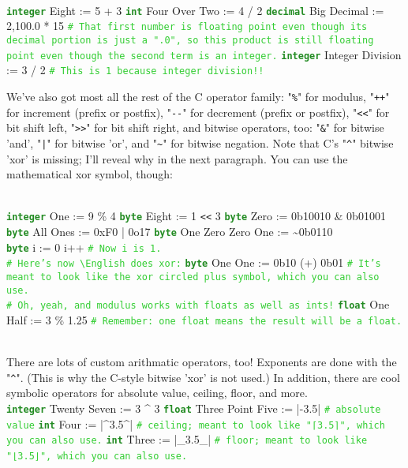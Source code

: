 \documentclass{article}
\newcommand{\English}{\textbackslash{}English}				%
\newcommand{\codecomment}[1]{\texttt{\textcolor{LimeGreen}{#1}}}
\newcommand{\commentline}[1]{\codecomment{\# #1}}
\newcommand{\type}[1]{\texttt{\textcolor{ForestGreen}{\textbf{#1}}}}
\newenvironment{code}[0]
{\ttfamily{}				%
\setlength\parindent{0cm}	%
~\\}
{\setlength\parindent{1cm}
~\\}
\begin{document}
\begin{code}
\type{integer} Eight := 5 + 3
\type{int} Four Over Two := 4 / 2
\type{decimal} Big Decimal := 2,100.0 * 15 \commentline{That first number is floating point even though its decimal portion is just a ".0", so this product is still floating point even though the second term is an integer.}
\type{integer} Integer Division := 3 / 2 \commentline{This is 1 because integer division!!}
\end{code}

\indent We've also got most all the rest of the C operator family: "\texttt{\%}" for modulus, "\texttt{++}" for increment (prefix or postfix), "\verb+--+" for decrement (prefix or postfix), "\verb+<<+" for bit shift left, "\verb+>>+" for bit shift right, and bitwise operators, too: "\texttt{\&}" for bitwise 'and', "\texttt{|}" for bitwise 'or', and "\texttt{\textasciitilde}" for bitwise negation.
\indent Note that C's "\texttt{\^}" bitwise 'xor' is missing; I'll reveal why in the next paragraph. You can use the mathematical xor symbol, though:

\begin{code}
\type{integer} One := 9 \% 4
\type{byte} Eight := 1 \verb+<<+ 3
\type{byte} Zero := 0b10010 \& 0b01001
\type{byte} All Ones := 0xF0 | 0o17
\type{byte} One Zero Zero One := \textasciitilde{}0b0110\\

\type{byte} i := 0
i++	\commentline{Now i is 1.}\\

\commentline{Here's now \English{} does xor:}
\type{byte} One One := 0b10 (+) 0b01 \commentline{It's meant to look like the xor circled plus symbol, which you can also use.}\\

\commentline{Oh, yeah, and modulus works with floats as well as ints!}
\type{float} One Half := 3 \% 1.25	\commentline{Remember: one float means the result will be a float.}
\end{code}

\indent There are lots of custom arithmatic operators, too! Exponents are done with the "\texttt{\^}". (This is why the C-style bitwise 'xor' is not used.) In addition, there are cool symbolic operators for absolute value, ceiling, floor, and more.
\begin{code}
\type{integer} Twenty Seven := 3 \^{} 3
\type{float} Three Point Five := |-3.5|	\commentline{absolute value}
\type{int} Four := |\^{}3.5\^{}| \commentline{ceiling; meant to look like "⌈3.5⌉", which you can also use.}
\type{int} Three := |\_3.5\_| \commentline{floor; meant to look like "⌊3.5⌋", which you can also use.}
\end{code}
\end{document}
